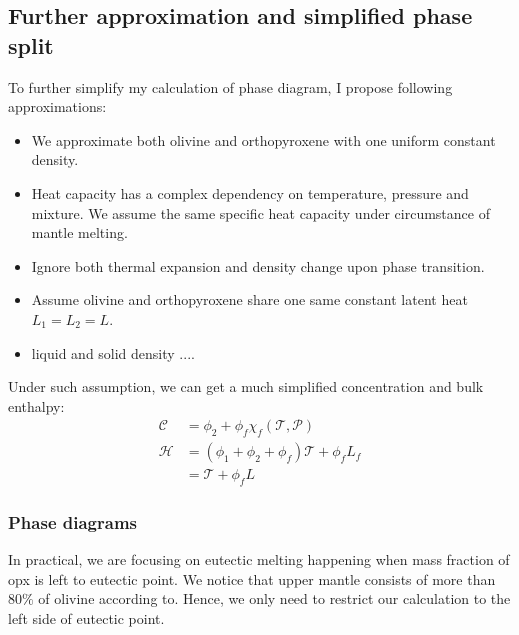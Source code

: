 \subsection{Further approximation and simplified phase split}
To further simplify my calculation of phase diagram, I propose following approximations:
\begin{itemize}
\item  We approximate both olivine and orthopyroxene with one uniform constant density.
\item  Heat capacity has a complex dependency on temperature, pressure and mixture. We assume the same 
		  specific heat capacity under circumstance of mantle melting.
\item  Ignore both thermal expansion and density change upon phase transition.
\item  Assume olivine and orthopyroxene share one same constant latent heat $L_1 = L_2 = L$.
\item  liquid and solid density .... 
\end{itemize}
Under such assumption, we can get a much simplified concentration and bulk enthalpy:
\begin{equation}
\begin{aligned}
\mathcal{C} &= \phi_2 + \phi_f \chi_f(\mathcal{T}, \mathcal{P}) \\
\mathcal{H} &= (\phi_1 + \phi_2 + \phi_f)\mathcal{T} + \phi_f L_f \\
            &= \mathcal{T}  + \phi_f L
\end{aligned}
\end{equation}

\subsubsection{Phase diagrams}
In practical, we are focusing on eutectic melting happening when mass fraction
of opx is left to eutectic point. We notice that upper mantle consists of more
than $80\%$ of olivine according to\cite{TheCompositionEarth}. Hence, we only need to
restrict our calculation to the left side of eutectic point.

